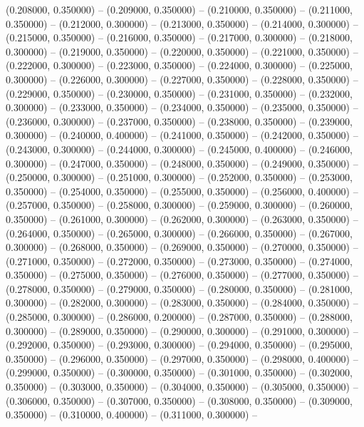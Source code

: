 (0.208000, 0.350000) -- 
(0.209000, 0.350000) -- 
(0.210000, 0.350000) -- 
(0.211000, 0.350000) -- 
(0.212000, 0.300000) -- 
(0.213000, 0.350000) -- 
(0.214000, 0.300000) -- 
(0.215000, 0.350000) -- 
(0.216000, 0.350000) -- 
(0.217000, 0.300000) -- 
(0.218000, 0.300000) -- 
(0.219000, 0.350000) -- 
(0.220000, 0.350000) -- 
(0.221000, 0.350000) -- 
(0.222000, 0.300000) -- 
(0.223000, 0.350000) -- 
(0.224000, 0.300000) -- 
(0.225000, 0.300000) -- 
(0.226000, 0.300000) -- 
(0.227000, 0.350000) -- 
(0.228000, 0.350000) -- 
(0.229000, 0.350000) -- 
(0.230000, 0.350000) -- 
(0.231000, 0.350000) -- 
(0.232000, 0.300000) -- 
(0.233000, 0.350000) -- 
(0.234000, 0.350000) -- 
(0.235000, 0.350000) -- 
(0.236000, 0.300000) -- 
(0.237000, 0.350000) -- 
(0.238000, 0.350000) -- 
(0.239000, 0.300000) -- 
(0.240000, 0.400000) -- 
(0.241000, 0.350000) -- 
(0.242000, 0.350000) -- 
(0.243000, 0.300000) -- 
(0.244000, 0.300000) -- 
(0.245000, 0.400000) -- 
(0.246000, 0.300000) -- 
(0.247000, 0.350000) -- 
(0.248000, 0.350000) -- 
(0.249000, 0.350000) -- 
(0.250000, 0.300000) -- 
(0.251000, 0.300000) -- 
(0.252000, 0.350000) -- 
(0.253000, 0.350000) -- 
(0.254000, 0.350000) -- 
(0.255000, 0.350000) -- 
(0.256000, 0.400000) -- 
(0.257000, 0.350000) -- 
(0.258000, 0.300000) -- 
(0.259000, 0.300000) -- 
(0.260000, 0.350000) -- 
(0.261000, 0.300000) -- 
(0.262000, 0.300000) -- 
(0.263000, 0.350000) -- 
(0.264000, 0.350000) -- 
(0.265000, 0.300000) -- 
(0.266000, 0.350000) -- 
(0.267000, 0.300000) -- 
(0.268000, 0.350000) -- 
(0.269000, 0.350000) -- 
(0.270000, 0.350000) -- 
(0.271000, 0.350000) -- 
(0.272000, 0.350000) -- 
(0.273000, 0.350000) -- 
(0.274000, 0.350000) -- 
(0.275000, 0.350000) -- 
(0.276000, 0.350000) -- 
(0.277000, 0.350000) -- 
(0.278000, 0.350000) -- 
(0.279000, 0.350000) -- 
(0.280000, 0.350000) -- 
(0.281000, 0.300000) -- 
(0.282000, 0.300000) -- 
(0.283000, 0.350000) -- 
(0.284000, 0.350000) -- 
(0.285000, 0.300000) -- 
(0.286000, 0.200000) -- 
(0.287000, 0.350000) -- 
(0.288000, 0.300000) -- 
(0.289000, 0.350000) -- 
(0.290000, 0.300000) -- 
(0.291000, 0.300000) -- 
(0.292000, 0.350000) -- 
(0.293000, 0.300000) -- 
(0.294000, 0.350000) -- 
(0.295000, 0.350000) -- 
(0.296000, 0.350000) -- 
(0.297000, 0.350000) -- 
(0.298000, 0.400000) -- 
(0.299000, 0.350000) -- 
(0.300000, 0.350000) -- 
(0.301000, 0.350000) -- 
(0.302000, 0.350000) -- 
(0.303000, 0.350000) -- 
(0.304000, 0.350000) -- 
(0.305000, 0.350000) -- 
(0.306000, 0.350000) -- 
(0.307000, 0.350000) -- 
(0.308000, 0.350000) -- 
(0.309000, 0.350000) -- 
(0.310000, 0.400000) -- 
(0.311000, 0.300000) -- 
